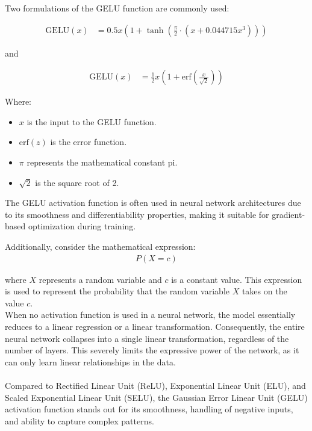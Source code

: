 \noindent Two formulations of the GELU function are commonly used:

\begin{align}
    \text{GELU}(x) & = 0.5x \left(1 + \tanh\left(\frac{\pi}{2} \cdot \left(x + 0.044715x^3\right)\right)\right) \label{eq:gelu}
\end{align}


and

\begin{align}
    \text{GELU}(x) & = \frac{1}{2}x \left(1 + \text{erf}\left(\frac{x}{\sqrt{2}}\right)\right) \label{eq:gelu2}
\end{align}

Where:
\begin{itemize}
    \item $x$ is the input to the GELU function.
    \item $\text{erf}(z)$ is the error function.
    \item $\pi$ represents the mathematical constant pi.
    \item $\sqrt{2}$ is the square root of 2.
\end{itemize}

The GELU activation function is often used in neural network architectures due to its smoothness and differentiability properties, making it suitable for gradient-based optimization during training.

\noindent Additionally, consider the mathematical expression:
\begin{align}
    P(X = c) \label{eq:probability}
\end{align}

where $X$ represents a random variable and $c$ is a constant value. This expression is used to represent the probability that the random variable $X$ takes on the value $c$.
\\
When no activation function is used in a neural network, the model essentially reduces to a linear regression or a linear transformation. Consequently, the entire neural network collapses into a single linear transformation, regardless of the number of layers. This severely limits the expressive power of the network, as it can only learn linear relationships in the data.
\\
\\
Compared to Rectified Linear Unit (ReLU), Exponential Linear Unit (ELU), and Scaled Exponential Linear Unit (SELU), the Gaussian Error Linear Unit (GELU) activation function stands out for its smoothness, handling of negative inputs, and ability to capture complex patterns.



